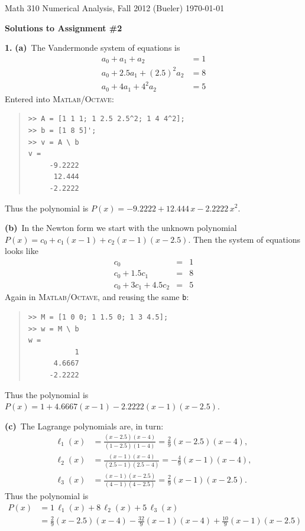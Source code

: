 \documentclass[11pt]{amsart}
\newcommand{\MO}{\textsc{Matlab/Octave}\xspace}
\newcommand{\ppart}[1]{\textbf{(#1)}\, }
\newcommand{\epart}[1]{\medskip\noindent\quad\textbf{(#1)}\, }
\newcommand{\prob}[1]{\medskip\noindent\textbf{#1.}\quad }
\begin{document}
\scriptsize \noindent Math 310 Numerical Analysis, Fall 2012 (Bueler) \hfill \today
\normalsize\bigskip
\thispagestyle{empty}

\Large

\centerline{\textbf{Solutions to Assignment \#2}}
\normalsize

\medskip

\prob{1} \ppart{a} The Vandermonde system of equations is
\begin{align*}
a_0 + a_1 + a_2 &= 1 \\
a_0 + 2.5 a_1 + (2.5)^2 a_2 &= 8 \\
a_0 + 4 a_1 + 4^2 a_2 &= 5
\end{align*}
Entered into \MO:
\small \begin{quote}\begin{Verbatim}
>> A = [1 1 1; 1 2.5 2.5^2; 1 4 4^2];
>> b = [1 8 5]';
>> v = A \ b
v =
     -9.2222
      12.444
     -2.2222
\end{Verbatim}
\end{quote} \normalsize
Thus the polynomial is $P(x) = -9.2222 + 12.444\, x - 2.2222\, x^2$.

\epart{b} In the Newton form we start with the unknown polynomial $P(x) = c_0 + c_1(x-1) + c_2(x-1)(x-2.5)$.  Then the system of equations looks like
$$\begin{array}{lcl}
c_0      &=& 1 \\
c_0 + 1.5 c_1    &=& 8 \\
c_0 + 3 c_1 + 4.5 c_2  &=& 5
\end{array}$$
Again in \MO, and reusing the same \texttt{b}:
\small \begin{quote}\begin{Verbatim}
>> M = [1 0 0; 1 1.5 0; 1 3 4.5];
>> w = M \ b
w =
           1
      4.6667
     -2.2222
\end{Verbatim}
\end{quote} \normalsize
Thus the polynomial is $P(x) = 1 + 4.6667 (x-1) - 2.2222 (x-1)(x-2.5)$.

\epart{c} The Lagrange polynomials are, in turn:
\begin{align*}
\ell_1(x) &= \frac{(x-2.5)(x-4)}{(1-2.5)(1-4)} = \frac{2}{9} (x-2.5)(x-4), \\
\ell_2(x) &= \frac{(x-1)(x-4)}{(2.5-1)(2.5-4)} = - \frac{4}{9} (x-1)(x-4), \\
\ell_3(x) &= \frac{(x-1)(x-2.5)}{(4-1)(4-2.5)} = \frac{2}{9} (x-1)(x-2.5).
\end{align*}
Thus the polynomial is
\begin{align*}
   P(x) &= 1\,\ell_1(x) + 8\,\ell_2(x) + 5\,\ell_3(x) \\
        &= \frac{2}{9} (x-2.5)(x-4) - \frac{32}{9} (x-1)(x-4) + \frac{10}{9} (x-1)(x-2.5)
\end{align*}
\end{document}

